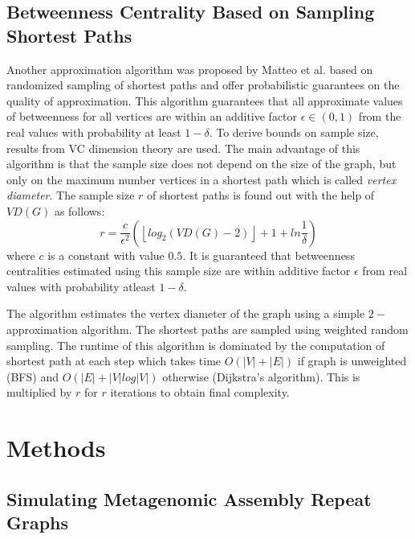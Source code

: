 \documentclass[runningheads,a4paper]{llncs}
\begin{document}
\subsection*{Betweenness Centrality Based on Sampling Shortest Paths}
Another approximation algorithm was proposed by Matteo et al. \cite{matteo} based on randomized sampling of shortest paths and offer probabilistic guarantees on the quality of approximation. This algorithm guarantees that all approximate values of betweenness for all vertices are within an additive factor $\epsilon \in (0,1)$ from the real values with probability at least $1-\delta$. To derive bounds on sample size, results from VC dimension theory\cite{vc} are used. The main advantage of this algorithm is that the sample size does not depend on the size of the graph, but only on the maximum number vertices in a shortest path which is called \textit{vertex diameter}. The sample size $r$ of shortest paths is found out with the help of $VD(G)$ as follows:
\begin{equation} \label{sample_size_algo}
r = \frac{c}{\epsilon^{2}}(\left\lfloor{log_{2}(VD(G) - 2)}\right\rfloor + 1 + ln\frac{1}{\delta})
\end{equation} 
where $c$ is a constant with value $0.5$. It is guaranteed that betweenness centralities estimated using this sample size are within additive factor $\epsilon$ from real values with probability atleast $1-\delta$. 

The algorithm estimates the vertex diameter of the graph using a simple $2-$approximation algorithm. The shortest paths are sampled using weighted random sampling. The runtime of this algorithm is dominated by the computation of shortest path at each step which takes time $O(|V| + |E|)$ if graph is unweighted (BFS) and $O(|E| + |V|log|V|)$ otherwise (Dijkstra's algorithm). This is multiplied by $r$ for $r$ iterations to obtain final complexity.


\section{Methods}


\subsection*{Simulating Metagenomic Assembly Repeat Graphs}
\end{document}
